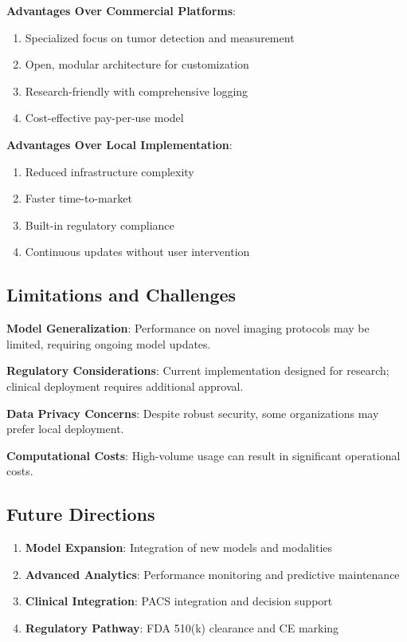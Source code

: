 \documentclass[12pt,a4paper]{article}
\begin{document}
\textbf{Advantages Over Commercial Platforms}:
\begin{enumerate}
    \item Specialized focus on tumor detection and measurement
    \item Open, modular architecture for customization
    \item Research-friendly with comprehensive logging
    \item Cost-effective pay-per-use model
\end{enumerate}

\textbf{Advantages Over Local Implementation}:
\begin{enumerate}
    \item Reduced infrastructure complexity
    \item Faster time-to-market
    \item Built-in regulatory compliance
    \item Continuous updates without user intervention
\end{enumerate}

\subsection{Limitations and Challenges}

\textbf{Model Generalization}: Performance on novel imaging protocols may be limited, requiring ongoing model updates.

\textbf{Regulatory Considerations}: Current implementation designed for research; clinical deployment requires additional approval.

\textbf{Data Privacy Concerns}: Despite robust security, some organizations may prefer local deployment.

\textbf{Computational Costs}: High-volume usage can result in significant operational costs.

\subsection{Future Directions}

\begin{enumerate}
    \item \textbf{Model Expansion}: Integration of new models and modalities
    \item \textbf{Advanced Analytics}: Performance monitoring and predictive maintenance
    \item \textbf{Clinical Integration}: PACS integration and decision support
    \item \textbf{Regulatory Pathway}: FDA 510(k) clearance and CE marking
\end{enumerate}
\end{document}
